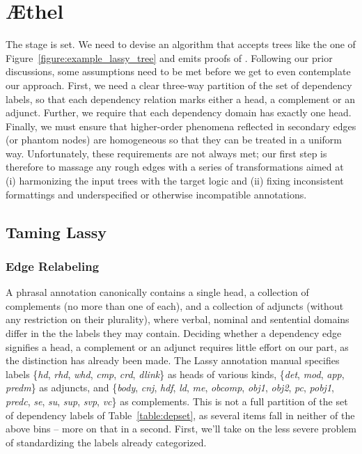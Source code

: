 \section{\AE thel}
\label{section:aethel}
The stage is set.
We need to devise an algorithm that accepts trees like the one of Figure~\ref{figure:example_lassy_tree} and emits proofs of \LPplus{}.
Following our prior discussions, some assumptions need to be met before we get to even contemplate our approach.
First, we need a clear three-way partition of the set of dependency labels, so that each dependency relation marks either a head, a complement or an adjunct.
Further, we require that each dependency domain has exactly one head.
Finally, we must ensure that higher-order phenomena reflected in secondary edges (or phantom nodes) are homogeneous so that they can be treated in a uniform way.
Unfortunately, these requirements are not always met; our first step is therefore to massage any rough edges with a series of transformations aimed at (i) harmonizing the input trees with the target logic and (ii) fixing inconsistent formattings and underspecified or otherwise incompatible annotations. 

\subsection{Taming Lassy}
\subsubsection{Edge Relabeling}
A phrasal annotation canonically contains a single head, a collection of complements (no more than one of each), and a collection of adjuncts (without any restriction on their plurality), where verbal, nominal and sentential domains differ in the the labels they may contain.
Deciding whether a dependency edge signifies a head, a complement or an adjunct requires little effort on our part, as the distinction has already been made.
The Lassy annotation manual specifies labels \{\textit{hd}, \textit{rhd}, \textit{whd}, \textit{cmp}, \textit{crd}, \textit{dlink}\} as heads of various kinds, \{\textit{det}, \textit{mod}, \textit{app}, \textit{predm}\} as adjuncts, and \{\textit{body}, \textit{cnj}, \textit{hdf}, \textit{ld}, \textit{me}, \textit{obcomp}, \textit{obj1}, \textit{obj2}, \textit{pc}, \textit{pobj1}, \textit{predc}, \textit{se}, \textit{su}, \textit{sup}, \textit{svp}, \textit{vc}\} as complements.
This is not a full partition of the set of dependency labels of Table~\ref{table:depset}, as several items fall in neither of the above bins -- more on that in a second.
First, we'll take on the less severe problem of standardizing the labels already categorized.

